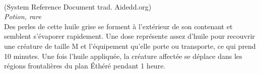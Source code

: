 \\
{\small (System Reference Document trad. Aidedd.org)}\\
{\small \it Potion, rare}\\
Des perles de cette huile grise se forment à l'extérieur de son contenant et semblent s'évaporer rapidement.
Une dose représente assez d'huile pour recouvrir une créature de taille M et l'équipement qu'elle porte ou transporte, ce qui prend 10 minutes. Une fois l'huile appliquée, la créature affectée se déplace dans les régions frontalières du plan Éthéré pendant 1 heure. \\

